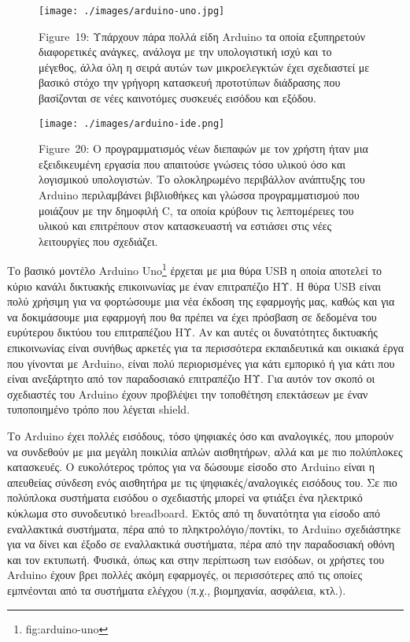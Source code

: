 \documentclass[
]{article}
\begin{document}
\leavevmode{}%
\begin{figure}
\hypertarget{fig:arduino-uno}{%
\centering
\texttt{[image: ./images/arduino-uno.jpg]}
\caption{Figure~19: Υπάρχουν πάρα πολλά είδη Arduino τα οποία
εξυπηρετούν διαφορετικές ανάγκες, ανάλογα με την υπολογιστική ισχύ και
το μέγεθος, άλλα όλη η σειρά αυτών των μικροελεγκτών έχει σχεδιαστεί με
βασικό στόχο την γρήγορη κατασκευή προτοτύπων διάδρασης που βασίζονται
σε νέες καινοτόμες συσκευές εισόδου και εξόδου.}\label{fig:arduino-uno}
}
\end{figure}

\leavevmode{}%
\begin{figure}
\hypertarget{fig:arduino-ide}{%
\centering
\texttt{[image: ./images/arduino-ide.png]}
\caption{Figure~20: Ο προγραμματισμός νέων διεπαφών με τον χρήστη ήταν
μια εξειδικευμένη εργασία που απαιτούσε γνώσεις τόσο υλικού όσο και
λογισμικού υπολογιστών. Το ολοκληρωμένο περιβάλλον ανάπτυξης του Arduino
περιλαμβάνει βιβλιοθήκες και γλώσσα προγραμματισμού που μοιάζουν με την
δημοφιλή C, τα οποία κρύβουν τις λεπτομέρειες του υλικού και επιτρέπουν
στον κατασκευαστή να εστιάσει στις νέες λειτουργίες που
σχεδιάζει.}\label{fig:arduino-ide}
}
\end{figure}

Το βασικό μοντέλο Arduino Uno\footnote{fig:arduino-uno} έρχεται με μια
θύρα USB η οποία αποτελεί το κύριο κανάλι δικτυακής επικοινωνίας με έναν
επιτραπέζιο ΗΥ. Η θύρα USB είναι πολύ χρήσιμη για να φορτώσουμε μια νέα
έκδοση της εφαρμογής μας, καθώς και για να δοκιμάσουμε μια εφαρμογή που
θα πρέπει να έχει πρόσβαση σε δεδομένα του ευρύτερου δικτύου του
επιτραπέζιου ΗΥ. Αν και αυτές οι δυνατότητες δικτυακής επικοινωνίας
είναι συνήθως αρκετές για τα περισσότερα εκπαιδευτικά και οικιακά έργα
που γίνονται με Arduino, είναι πολύ περιορισμένες για κάτι εμπορικό ή
για κάτι που είναι ανεξάρτητο από τον παραδοσιακό επιτραπέζιο ΗΥ. Για
αυτόν τον σκοπό οι σχεδιαστές του Arduino έχουν προβλέψει την τοποθέτηση
επεκτάσεων με έναν τυποποιημένο τρόπο που λέγεται shield.

Το Arduino έχει πολλές εισόδους, τόσο ψηφιακές όσο και αναλογικές, που
μπορούν να συνδεθούν με μια μεγάλη ποικιλία απλών αισθητήρων, αλλά και
με πιο πολύπλοκες κατασκευές. Ο ευκολότερος τρόπος για να δώσουμε είσοδο
στο Arduino είναι η απευθείας σύνδεση ενός αισθητήρα με τις
ψηφιακές/αναλογικές εισόδους του. Σε πιο πολύπλοκα συστήματα εισόδου ο
σχεδιαστής μπορεί να φτιάξει ένα ηλεκτρικό κύκλωμα στο συνοδευτικό
breadboard. Εκτός από τη δυνατότητα για είσοδο από εναλλακτικά
συστήματα, πέρα από το πληκτρολόγιο/ποντίκι, το Arduino σχεδιάστηκε για
να δίνει και έξοδο σε εναλλακτικά συστήματα, πέρα από την παραδοσιακή
οθόνη και τον εκτυπωτή. Φυσικά, όπως και στην περίπτωση των εισόδων, οι
χρήστες του Arduino έχουν βρει πολλές ακόμη εφαρμογές, οι περισσότερες
από τις οποίες εμπνέονται από τα συστήματα ελέγχου (π.χ., βιομηχανία,
ασφάλεια, κτλ.).
\end{document}
